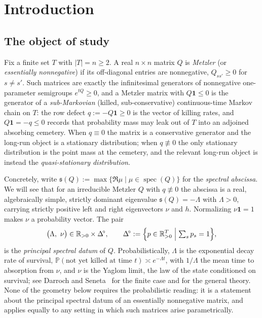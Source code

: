 \documentclass[11pt,reqno]{amsart}
\theoremstyle{plain}
\theoremstyle{definition}
\theoremstyle{remark}
\newcommand{\R}{\mathbb{R}}
\newcommand{\Simp}{\Delta^{\!\circ}}
\newcommand{\one}{\mathbf{1}}
\newcommand{\abscissa}{\mathfrak{s}}
\DeclareMathOperator{\spec}{spec}
\begin{document}
\maketitle

\newpage
\tableofcontents
\newpage

\section{Introduction}\label{sec:intro}


\subsection{The object of study}
Fix a finite set $T$ with $|T|=n\ge 2$. A real $n\times n$ matrix $Q$ is
\emph{Metzler} (or \emph{essentially nonnegative}) if its off-diagonal entries are
nonnegative, $Q_{ss'}\ge 0$ for $s\neq s'$. Such matrices are exactly the
infinitesimal generators of nonnegative one-parameter semigroups
$e^{tQ}\ge 0$, and a Metzler matrix with $Q\one\le 0$ is the generator of a
\emph{sub-Markovian} (killed, sub-conservative) continuous-time Markov chain on
$T$: the row defect $q:=-Q\one\ge 0$ is the vector of killing rates, and
$Q\one=-q\le0$ records that probability mass may leak out of $T$ into an
adjoined absorbing cemetery. When $q\equiv 0$ the matrix is a conservative
generator and the long-run object is a stationary distribution; when $q\not\equiv
0$ the only stationary distribution is the point mass at the cemetery, and the
relevant long-run object is instead the \emph{quasi-stationary distribution}.

Concretely, write $\abscissa(Q):=\max\{\Re\mu\mid\mu\in\spec(Q)\}$ for the
\emph{spectral abscissa}. We will see that for an irreducible Metzler $Q$ with
$q\not\equiv 0$ the abscissa is a real, algebraically simple, strictly dominant
eigenvalue $\abscissa(Q)=-\Lambda$ with $\Lambda>0$, carrying strictly positive
left and right eigenvectors $\nu$ and $h$. Normalizing $\nu\one=1$ makes $\nu$ a
probability vector. The pair
\[
\bigl(\Lambda,\ \nu\bigr)\in\R_{>0}\times\Simp,
\qquad
\Simp:=\Bigl\{p\in\R^{T}_{>0}\Bigm|\textstyle\sum_{s}p_s=1\Bigr\},
\]
is the \emph{principal spectral datum} of $Q$. Probabilistically, $\Lambda$ is the
exponential decay rate of survival, $\mathbb P(\text{not yet killed at time }t)
\asymp e^{-\Lambda t}$, with $1/\Lambda$ the mean time to absorption from $\nu$,
and $\nu$ is the Yaglom limit, the law of the state conditioned on survival; see
Darroch and Seneta~\cite{DarrochSeneta1967} for the finite case and
\cite{MeleardVillemonais2012,ColletMartinezSanMartin2013,vanDoornPollett2013} for
the general theory. None of the geometry below requires the probabilistic
reading: it is a statement about the principal spectral datum of an essentially
nonnegative matrix, and applies equally to any setting in which such matrices
arise parametrically.
\end{document}
